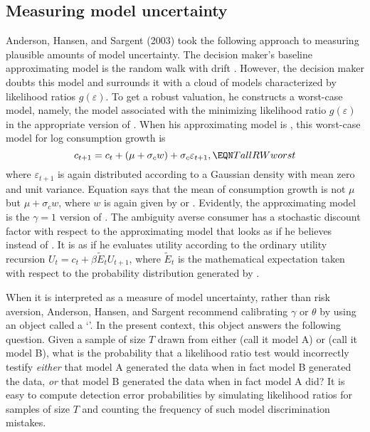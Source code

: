 \subsection{Measuring model uncertainty}\label{sec:measureambiguity}%
Anderson, Hansen, and Sargent (2003) took the following approach to measuring plausible  amounts of model uncertainty.
The decision maker's baseline approximating model is the random walk with drift  .  However, the decision
maker doubts this model and surrounds it with a cloud of models characterized by likelihood ratios $g(\varepsilon)$.   To get a robust
valuation, he constructs a worst-case model, namely, the model associated with the minimizing likelihood ratio $g(\varepsilon)$ in the appropriate version of
. When his  approximating model is ,
this worst-case model for log consumption growth is
$$ c_{t+1} = c_t + (\mu + \sigma_c w) + \sigma_c \varepsilon_{t+1}, \EQN TallRWworst $$
where $\varepsilon_{t+1}$ is again distributed according to a Gaussian density with mean zero and unit variance.  Equation   says that the mean of consumption growth is not $\mu$ but $\mu + \sigma_c w$, where $w$
is again given by  or .  Evidently, the approximating model is the $\gamma=1$ version
of .  The ambiguity averse consumer has a stochastic discount factor with respect to the approximating
model  that looks as if he  believes  instead of . It is as if he evaluates utility according to the ordinary utility
recursion $U_t = c_t + \beta \tilde E_t U_{t+1}$, where $\tilde E_t$ is the mathematical expectation taken with respect to the probability distribution generated by .

When it is  interpreted as a measure of model uncertainty, rather than risk aversion, Anderson, Hansen, and Sargent recommend
calibrating $\gamma$ or $\theta$ by using an object called a  `'. In the present context, this object answers the following question.
Given a sample of size $T$ drawn from either   (call it model A) or  (call it model B), what is the probability that a likelihood ratio test would incorrectly testify {\it either\/} that
model A generated the data  when in fact model B generated the data, {\it or\/} that model B generated the data when in fact model A did?
It is easy to compute detection error probabilities by simulating likelihood ratios for samples of size $T$ and counting the frequency of such model discrimination  mistakes.

